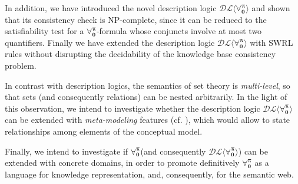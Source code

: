 \documentclass[a4paper,UKenglish]{lipics}
\newcommand{\Lang}{\ensuremath{\mathbf{\forall_{0}^{\pi}}}\xspace}
\newcommand{\dlLang}{\ensuremath{\mathcal{DL\langle}\Lang\mathcal{\rangle}}\xspace}
\begin{document}
In addition, we have introduced the novel description logic \dlLang
and shown that its consistency check is \textsc{NP}-complete, since it
can be reduced to the satisfiability test for a \Lang-formula whose
conjuncts involve at most two quantifiers.  Finally we have extended
the description logic \dlLang with \textsf{SWRL} rules without
disrupting the decidability of the knowledge base consistency problem.

In contrast with description logics, 
the semantics of set theory is \emph{multi-level}, so that
sets (and consequently relations) can be nested
arbitrarily.
In the light of this observation, we intend to
investigate whether the description logic \dlLang can be extended with
\emph{meta-modeling}
features (cf.
\cite{Mot2007}), which would allow to state relationships
among elements of the conceptual model.

Finally, we intend to investigate if \Lang (and consequently \dlLang) can be
extended with concrete domains, in order to promote definitively \Lang
as a language for knowledge representation, and, consequently,
for the semantic web.
\end{document}
